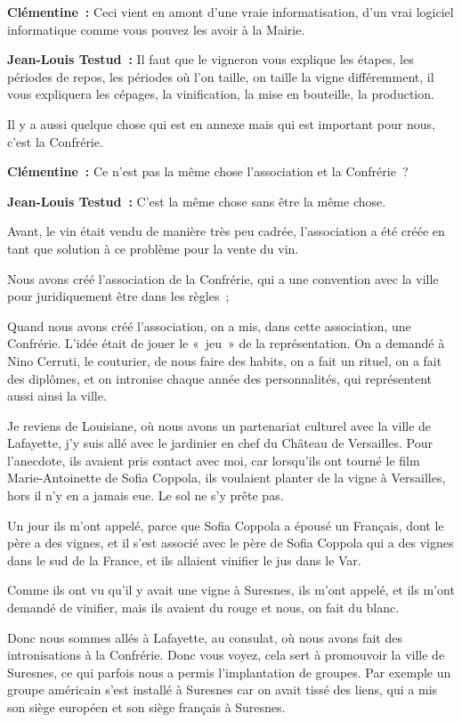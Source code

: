 \documentclass[a4paper, titlepage]{report}
\begin{document}
\textbf{Clémentine~:} Ceci vient en amont d'une vraie informatisation,
d'un vrai logiciel informatique comme vous pouvez les avoir à la Mairie.

\textbf{Jean-Louis Testud~:} Il faut que le vigneron vous explique les
étapes, les périodes de repos, les périodes où l'on taille, on taille la
vigne différemment, il vous expliquera les cépages, la vinification, la
mise en bouteille, la production.

Il y a aussi quelque chose qui est en annexe mais qui est important pour
nous, c'est la Confrérie.

\textbf{Clémentine~:} Ce n'est pas la même chose l'association et la
Confrérie~?

\textbf{Jean-Louis Testud~:} C'est la même chose sans être la même
chose.

Avant, le vin était vendu de manière très peu cadrée, l'association a
été créée en tant que solution à ce problème pour la vente du vin.

Nous avons créé l'association de la Confrérie, qui a une convention avec
la ville pour juridiquement être dans les règles~;

Quand nous avons créé l'association, on a mis, dans cette association,
une Confrérie. L'idée était de jouer le «~jeu~» de la représentation. On
a demandé à Nino Cerruti, le couturier, de nous faire des habits, on a
fait un rituel, on a fait des diplômes, et on intronise chaque année des
personnalités, qui représentent aussi ainsi la ville.

Je reviens de Louisiane, où nous avons un partenariat culturel avec la
ville de Lafayette, j'y suis allé avec le jardinier en chef du Château
de Versailles. Pour l'anecdote, ils avaient pris contact avec moi, car
lorsqu'ils ont tourné le film Marie-Antoinette de Sofia Coppola, ils
voulaient planter de la vigne à Versailles, hors il n'y en a jamais eue.
Le sol ne s'y prête pas.

Un jour ils m'ont appelé, parce que Sofia Coppola a épousé un Français,
dont le père a des vignes, et il s'est associé avec le père de Sofia
Coppola qui a des vignes dans le sud de la France, et ils allaient
vinifier le jus dans le Var.

Comme ils ont vu qu'il y avait une vigne à Suresnes, ils m'ont appelé,
et ils m'ont demandé de vinifier, mais ils avaient du rouge et nous, on
fait du blanc.

Donc nous sommes allés à Lafayette, au consulat, où nous avons fait des
intronisations à la Confrérie. Donc vous voyez, cela sert à promouvoir la
ville de Suresnes, ce qui parfois nous a permis l'implantation de
groupes. Par exemple un groupe américain s'est installé à Suresnes car
on avait tissé des liens, qui a mis son siège européen et son siège
français à Suresnes.
\end{document}
